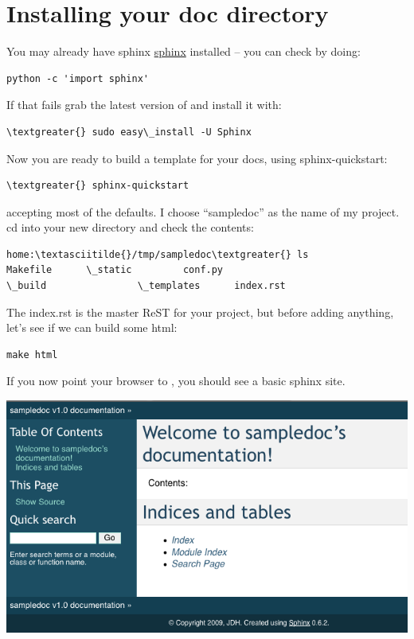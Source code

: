 \documentclass[letterpaper,10pt,english]{sphinxmanual}
\begin{document}
\section{Installing your doc directory}
\label{getting_started_ex:installing-your-doc-directory}\label{getting_started_ex:installing-docdir}
You may already have sphinx \href{http://sphinx.pocoo.org/}{sphinx}
installed -- you can check by doing:

\begin{Verbatim}[commandchars=\\\{\}]
python -c 'import sphinx'
\end{Verbatim}

If that fails grab the latest version of and install it with:

\begin{Verbatim}[commandchars=\\\{\}]
\textgreater{} sudo easy\_install -U Sphinx
\end{Verbatim}

Now you are ready to build a template for your docs, using
sphinx-quickstart:

\begin{Verbatim}[commandchars=\\\{\}]
\textgreater{} sphinx-quickstart
\end{Verbatim}

accepting most of the defaults.  I choose ``sampledoc'' as the name of my
project.  cd into your new directory and check the contents:

\begin{Verbatim}[commandchars=\\\{\}]
home:\textasciitilde{}/tmp/sampledoc\textgreater{} ls
Makefile      \_static         conf.py
\_build                \_templates      index.rst
\end{Verbatim}

The index.rst is the master ReST for your project, but before adding
anything, let's see if we can build some html:

\begin{Verbatim}[commandchars=\\\{\}]
make html
\end{Verbatim}

If you now point your browser to , you
should see a basic sphinx site.

\includegraphics{basic_screenshot.png}
\end{document}
